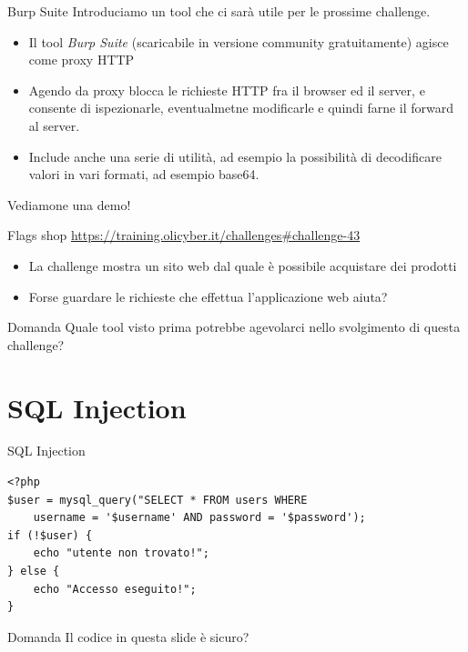 \documentclass[12pt]{beamer}
\begin{document}
\begin{frame}{Burp Suite}
    Introduciamo un tool che ci sarà utile per le prossime challenge. 
    \vfill
\begin{itemize}
    \item Il tool \textit{Burp Suite} (scaricabile in versione community gratuitamente) agisce 
        come proxy HTTP
    \item Agendo da proxy blocca le richieste HTTP fra il browser ed il server, e consente di ispezionarle, eventualmetne modificarle e quindi farne il forward al server.
    \item Include anche una serie di utilità, ad esempio la possibilità di decodificare valori in vari formati, ad esempio base64.
\end{itemize}
    \vfill
    Vediamone una demo!
\end{frame}

\begin{frame}{Flags shop}
    \url{https://training.olicyber.it/challenges\#challenge-43}
    \vfill
    \begin{itemize}
        \item La challenge mostra un sito web dal quale è possibile acquistare dei prodotti
        \pause
        \item Forse guardare le richieste che effettua l'applicazione web aiuta?
    \end{itemize}
    \vfill
    \begin{exampleblock}{Domanda}
        Quale tool visto prima potrebbe agevolarci nello svolgimento di questa challenge?
    \end{exampleblock}
\end{frame}


\section{SQL Injection}
\begin{frame}[fragile]{SQL Injection}
\begin{verbatim}
<?php
$user = mysql_query("SELECT * FROM users WHERE 
    username = '$username' AND password = '$password');
if (!$user) {
    echo "utente non trovato!";
} else {
    echo "Accesso eseguito!";
}
\end{verbatim}
\vfill
\begin{exampleblock}{Domanda}
    Il codice in questa slide è sicuro?
\end{exampleblock}
\end{frame}
\end{document}
